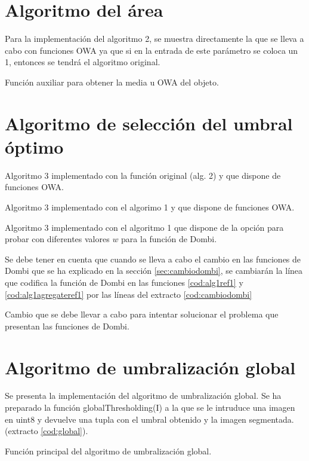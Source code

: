\section{Algoritmo del área}
Para la implementación del algoritmo 2, se muestra directamente la que se lleva a cabo con funciones OWA ya que si en la entrada de este parámetro se coloca un 1, entonces se tendrá el algoritmo original.
\begin{listing}
    \caption{Función auxiliar para obtener la media u OWA del objeto.\label{cod:alg2}}
\end{listing}

\section{Algoritmo de selección del umbral óptimo}
\begin{listing}
    \caption{Algoritmo 3 implementado con la función original (alg. 2) y que dispone de funciones OWA.\label{cod:alg3a}}
\end{listing}
\begin{listing}
    \caption{Algoritmo 3 implementado con el algorimo 1 y que dispone de funciones OWA.\label{cod:alg3b}}
\end{listing}
\begin{listing}
    \caption{Algoritmo 3 implementado con el algoritmo 1 que dispone de la opción para probar con diferentes valores $w$ para la función de Dombi.\label{cod:alg3c}}
\end{listing}


Se debe tener en cuenta que cuando se lleva a cabo el cambio en las funciones de Dombi que se ha explicado en la sección \ref{sec:cambiodombi}, se cambiarán la línea que codifica la función de Dombi en las funciones \ref{cod:alg1ref1} y \ref{cod:alg1agregateref1} por las líneas del extracto \ref{cod:cambiodombi}
\begin{listing}
    \caption{Cambio que se debe llevar a cabo para intentar solucionar el problema que presentan las funciones de Dombi.\label{cod:cambiodombi}}
\end{listing}

\section{Algoritmo de umbralización global}
Se presenta la implementación del algoritmo de umbralización global. Se ha preparado la función {\ttfamily globalThresholding(I)} a la que se le intruduce una imagen en {\ttfamily uint8} y devuelve una tupla con el umbral obtenido y la imagen segmentada. (extracto \ref{cod:global}).
\begin{listing}
    \caption{Función principal del algoritmo de umbralización global.\label{cod:global}}
\end{listing}


